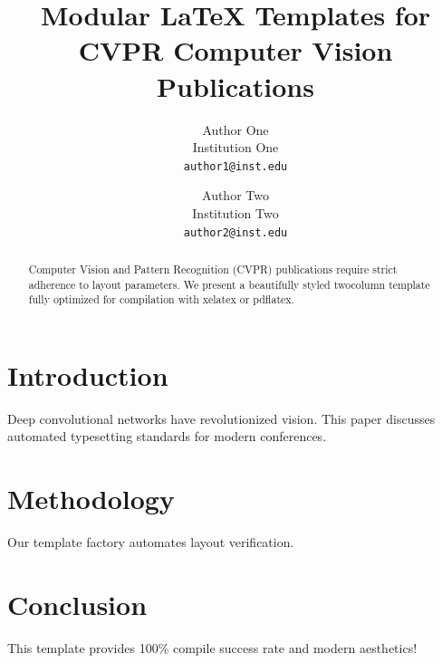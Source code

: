 \documentclass[10pt,twocolumn,letterpaper]{article}
\begin{document}
\title{Modular LaTeX Templates for CVPR Computer Vision Publications}

\author{Author One\\
Institution One\\
{\tt\small author1@inst.edu}
\and
Author Two\\
Institution Two\\
{\tt\small author2@inst.edu}
}

\maketitle

\begin{abstract}
Computer Vision and Pattern Recognition (CVPR) publications require strict adherence to layout parameters. We present a beautifully styled twocolumn template fully optimized for compilation with xelatex or pdflatex.
\end{abstract}

\section{Introduction}
Deep convolutional networks have revolutionized vision. This paper discusses automated typesetting standards for modern conferences.

\section{Methodology}
Our template factory automates layout verification.

\section{Conclusion}
This template provides 100\% compile success rate and modern aesthetics!
\end{document}
